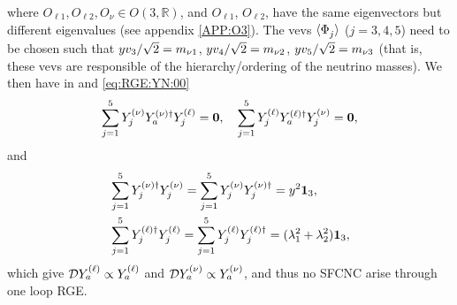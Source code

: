\documentclass[12pt,a4paper]{article}
\begin{document}
where $O_{\ell 1},O_{\ell 2},O_\nu\in O(3,\mathbb{R})$, and $O_{\ell 1}$, $O_{\ell 2}$, have the same eigenvectors but different eigenvalues (see appendix \ref{APP:O3}).
The vevs $\VEV{\SD{j}}$ ($j=3,4,5$) need to be chosen such that $yv_{3}/\sqrt{2}=m_{\nu 1}$, $yv_{4}/\sqrt{2}=m_{\nu 2}$, $yv_{5}/\sqrt{2}=m_{\nu 3}$ (that is, these vevs are responsible of the hierarchy/ordering of the neutrino masses). We then have in  and \eqref{eq:RGE:YN:00}
\begin{equation}
 \sum_{j=1}^5Y_{j}^{\rm (\nu)}Y_{a}^{\rm (\nu)\dagger}Y_{j}^{\rm (\ell)}=\mathbf{0},\quad \sum_{j=1}^5Y_{j}^{\rm (\ell)}Y_{a}^{\rm (\ell)\dagger}Y_{j}^{\rm (\nu)}=\mathbf{0},
\end{equation}
and
\begin{equation}
\begin{aligned}
 &\sum_{j=1}^5Y_{j}^{\rm (\nu)\dagger}Y_{j}^{\rm (\nu)}=\sum_{j=1}^5Y_{j}^{\rm (\nu)}Y_{j}^{\rm (\nu)\dagger}=y^2\mathbf{1}_3,\\
 &\sum_{j=1}^5Y_{j}^{\rm (\ell)\dagger}Y_{j}^{\rm (\ell)}=\sum_{j=1}^5Y_{j}^{\rm (\ell)}Y_{j}^{\rm (\ell)\dagger}=(\lambda_1^2+\lambda_2^2)\mathbf{1}_{3},
\end{aligned}
\end{equation}
which give $\mathcal DY_{a}^{\rm (\ell)}\propto Y_{a}^{\rm (\ell)}$ and $\mathcal DY_{a}^{\rm (\nu)}\propto Y_{a}^{\rm (\nu)}$, and thus no SFCNC arise through one loop RGE.

\end{document}
